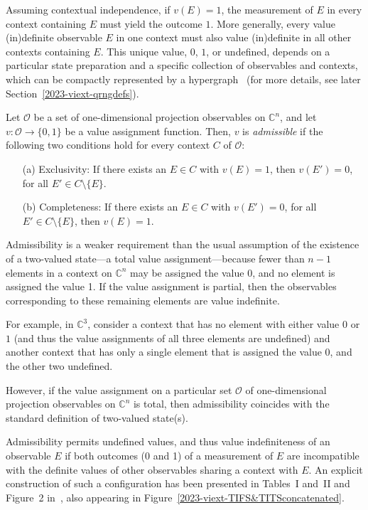 \documentclass[%
 reprint,
 superscriptaddress,
 showpacs,
 showkeys,
 nofootinbib,
  amsmath,amssymb,
 pra,
  longbibliography,
  floatfix,
 ]{revtex4-2}
\theoremstyle{definition}
\newcommand{\C}{\mathbb{C}}
\begin{document}
Assuming contextual independence, if  $v(E)=1$, the measurement of $E$ in every context containing $E$ must yield the outcome  $1$.
More generally, every value (in)definite observable $E$ in one context must also value (in)definite in all other contexts containing $E$.
This unique value, $0$, $1$, or undefined, depends on a particular state preparation and a specific collection of observables and contexts, which can be compactly represented by a hypergraph~\cite{greechie:71,Bretto-MR3077516} (for more details, see later Section~\ref{2023-viext-qrngdefs}).


Let $\mathcal{O}$ be a set of one-dimensional projection observables on $\C^n$, and let $v:\mathcal{O}\to\{0,1\}$ be a value assignment function.
Then, $v$ is {\it admissible} if the following two conditions hold for every context $C$ of $\mathcal{O}$:
        \begin{itemize}
                \item[(a)] Exclusivity: If there exists an $E\in C$ with $v(E)=1$, then $v(E')=0$, for all $E'\in C\setminus\{E\}$.
                \item[(b)] Completeness:                  If there exists an $E\in C$ with $v(E')=0$,   for all $E'\in C\setminus\{E\}$, then $v(E)=1$.
        \end{itemize}




Admissibility is a weaker requirement than the usual assumption of the existence
of a two-valued state---a total value assignment---because fewer than $n-1$ elements in a context on $\C^n$ may be assigned the value 0, and no element is assigned the value 1. If the value assignment is partial, then the observables corresponding to these remaining elements are value indefinite.

For example, in $\C^3$, consider a  context that has no element with either value $0$ or $1$ (and thus the value assignments of all three elements are undefined) and another context that has only a single element that is assigned the value $0$, and the other two undefined.

However, if the value assignment on a particular set $\mathcal{O}$ of one-dimensional projection observables on $\C^n$ is total,
then admissibility coincides with the standard definition of two-valued state(s).


Admissibility permits undefined values, and thus value indefiniteness of an observable $E$ if both outcomes (0 and 1) of a measurement of $E$
are incompatible with the definite values of other observables sharing a context with $E$.
An explicit construction of such a configuration has been presented in Tables~I and~II and Figure~2 in~\cite{2015-AnalyticKS}, also appearing in Figure~\ref{2023-viext-TIFS&TITSconcatenated}.
\end{document}
